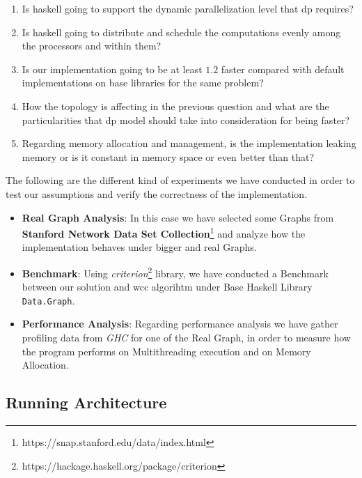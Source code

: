 \documentclass[preprint]{elsarticle}
\begin{document}
\begin{enumerate}[Q1.]\label{res:question}
    \item Is \acrshort{haskell} going to support the dynamic parallelization level that \acrshort{dp} requires?\label{q:1}
    \item Is \acrshort{haskell} going to distribute and schedule the computations evenly among the processors and within them?\label{q:2}
    \item Is our implementation going to be at least $1.2$ faster compared with default implementations on base libraries for the same problem?\label{q:3}
    \item How the topology is affecting in the previous question and what are the particularities that \acrshort{dp} model should take into consideration for being faster?\label{q:4}
    \item Regarding memory allocation and management, is the implementation leaking memory or is it constant in memory space or even better than that?\label{q:5} 
\end{enumerate}

The following are the different kind of experiments we have conducted in order to test our assumptions and verify the correctness of the implementation.

\begin{itemize}
  \item \textbf{Real Graph Analysis}: In this case we have selected some Graphs from \textbf{Stanford Network Data Set Collection}\footnote{https://snap.stanford.edu/data/index.html} and analyze how the implementation
  behaves under bigger and real Graphs.
  \item \textbf{Benchmark}: Using \textit{criterion}\footnote{https://hackage.haskell.org/package/criterion} library, we have conducted a Benchmark between our solution and \acrshort{wcc} algorihtm under Base Haskell Library \texttt{Data.Graph}.
  \item \textbf{Performance Analysis}: Regarding performance analysis we have gather profiling data from \textit{GHC} for one of the Real Graph, in order to measure how the program performs on Multithreading execution and 
  on Memory Allocation.
\end{itemize}

\subsection{\textbf{Running Architecture}}
\end{document}
